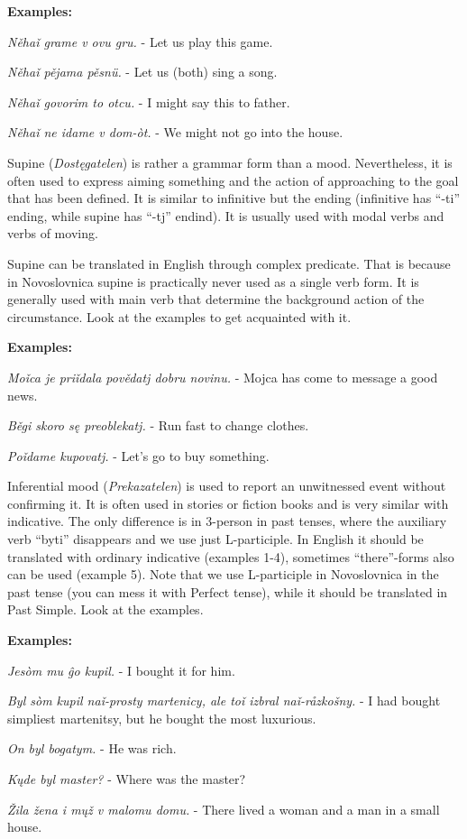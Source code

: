 \textbf{Examples:}

\textit{Něhaǐ grame v ovu gru.} - Let us play this game.

\textit{Něhaǐ pějama pěsnü.} - Let us (both) sing a song.

\textit{Něhaǐ govorim to otcu.} - I might say this to father.

\textit{Něhaǐ ne idame v dom-òt.} - We might not go into the house.


Supine (\textit{Dostęgatelen}) is rather a grammar form than a mood. Nevertheless, it is often used to express aiming something and the action of approaching to the goal that has been defined. It is similar to infinitive but the ending (infinitive has “-ti” ending, while supine has “-tj” endind). It is usually used with modal verbs and verbs of moving.

Supine can be translated in English through complex predicate. That is because in Novoslovnica supine is practically never used as a single verb form. It is generally used with main verb that determine the background action of the circumstance. Look at the examples to get acquainted with it.

\textbf{Examples:}

\textit{Moǐca je priǐdala povědatj dobru novinu.} - Mojca has come to message a good news.

\textit{Běgi skoro sę preoblekatj.} - Run fast to change clothes.

\textit{Poǐdame kupovatj.} - Let’s go to buy something.

Inferential mood (\textit{Prekazatelen}) is used to report an unwitnessed event without confirming it. It is often used in stories or fiction books and is very similar with indicative. The only difference is in 3-person in past tenses, where the auxiliary verb “byti” disappears and we use just L-participle. In English it should be translated with ordinary indicative (examples 1-4), sometimes “there”-forms also can be used (example 5). Note that we use L-participle in Novoslovnica in the past tense (you can mess it with Perfect tense), while it should be translated in Past Simple.
Look at the examples.

\textbf{Examples:}

\textit{Jesòm mu ĝo kupil.} - I bought it for him.

\textit{Byl sòm kupil naǐ-prosty martenicy, ale toǐ izbral naǐ-råzkošny.} - I had bought simpliest martenitsy, but he bought the most luxurious.

\textit{On byl bogatym.} - He was rich.

\textit{Kųde byl master?} - Where was the master?

\textit{Žila žena i mųž v malomu domu.} - There lived a woman and a man in a small house.
